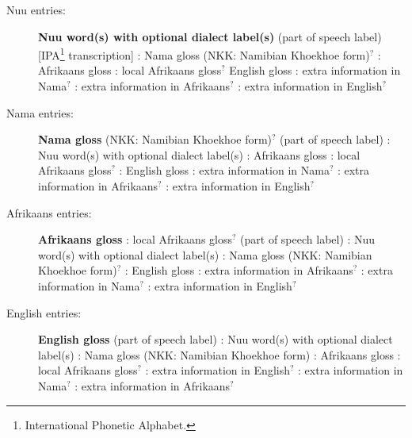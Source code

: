 \begin{description}
    \item [N\textipa{\textvertline}uu entries:]
        \textbf{N\textipa{\textvertline}uu word(s) with optional
        dialect label(s)} (part of
        speech label) [IPA\footnote{International Phonetic Alphabet.}
        transcription] : Nama gloss (NKK: Namibian
        Khoekhoe form)$^?$ : Afrikaans
        gloss : local
        Afrikaans gloss$^?$  English gloss
        : extra
        information in Nama$^?$ : extra
        information in Afrikaans$^?$ : extra
        information in English$^?$
    \item [Nama entries:] \textbf{Nama gloss} (NKK: Namibian Khoekhoe
        form)$^?$ (part
        of speech label) :
        N\textipa{\textvertline}uu word(s) with optional dialect
        label(s) : Afrikaans gloss
        : local Afrikaans
        gloss$^?$ : English gloss
        : extra information in Nama$^?$
        : extra information in
        Afrikaans$^?$ : extra information in
        English$^?$
    \item [Afrikaans entries:] \textbf{Afrikaans gloss}
        : local Afrikaans
        gloss$^?$ (part of speech label)
        :
        N\textipa{\textvertline}uu word(s) with optional dialect
        label(s) : Nama gloss (NKK: Namibian Khoekhoe
        form)$^?$ : English
        gloss : extra information in
        Afrikaans$^?$ : extra information in
        Nama$^?$ : extra information in
        English$^?$
    \item [English entries:] \textbf{English gloss} (part of speech
        label) : 
        N\textipa{\textvertline}uu word(s) with optional dialect
        label(s) : Nama gloss
        (NKK: Namibian Khoekhoe form) : Afrikaans gloss
        : local Afrikaans
        gloss$^?$ : extra information in
        English$^?$ : extra information in
        Nama$^?$ : extra information in
        Afrikaans$^?$
\end{description}



